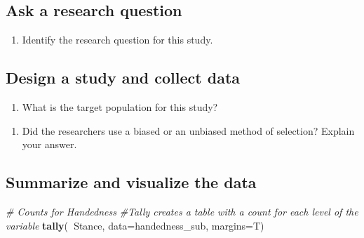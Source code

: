 \documentclass[
]{report}
\newenvironment{Shaded}{\begin{snugshade}}{\end{snugshade}}
\newcommand{\CommentTok}[1]{\textcolor[rgb]{0.56,0.35,0.01}{\textit{#1}}}
\newcommand{\DataTypeTok}[1]{\textcolor[rgb]{0.13,0.29,0.53}{#1}}
\newcommand{\KeywordTok}[1]{\textcolor[rgb]{0.13,0.29,0.53}{\textbf{#1}}}
\newcommand{\NormalTok}[1]{#1}
\newcommand{\OperatorTok}[1]{\textcolor[rgb]{0.81,0.36,0.00}{\textbf{#1}}}
\providecommand{\tightlist}{%
  \setlength{\itemsep}{0pt}\setlength{\parskip}{0pt}}
\begin{document}
\vspace{0.5in}

\hypertarget{ask-a-research-question}{%
\subsection{Ask a research question}\label{ask-a-research-question}}

\begin{enumerate}
\def\labelenumi{\arabic{enumi}.}
\setcounter{enumi}{4}
\tightlist
\item
  Identify the research question for this study.
\end{enumerate}

\vspace{1in}

\hypertarget{design-a-study-and-collect-data}{%
\subsection{Design a study and collect data}\label{design-a-study-and-collect-data}}

\begin{enumerate}
\def\labelenumi{\arabic{enumi}.}
\setcounter{enumi}{5}
\tightlist
\item
  What is the target population for this study?
\end{enumerate}

\vspace{0.5in}

\begin{enumerate}
\def\labelenumi{\arabic{enumi}.}
\setcounter{enumi}{6}
\tightlist
\item
  Did the researchers use a biased or an unbiased method of selection? Explain your answer.
\end{enumerate}

\vspace{1in}

\hypertarget{summarize-and-visualize-the-data}{%
\subsection{Summarize and visualize the data}\label{summarize-and-visualize-the-data}}

\begin{Shaded}
\begin{Highlighting}[]
\CommentTok{# Counts for Handedness}
\CommentTok{#Tally creates a table with a count for each level of the variable}
\KeywordTok{tally}\NormalTok{(}\OperatorTok{~}\NormalTok{Stance, }\DataTypeTok{data=}\NormalTok{handedness_sub, }\DataTypeTok{margins=}\NormalTok{T) }
\end{Highlighting}
\end{Shaded}
\end{document}
